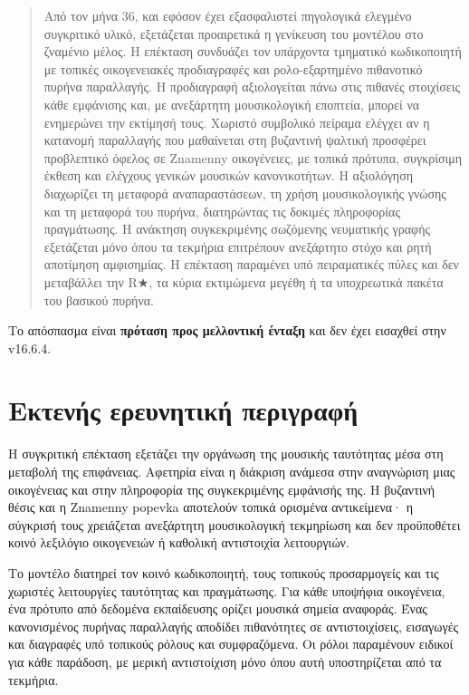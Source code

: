 \documentclass[
  10pt,
  a4paper,
]{report}
\begin{document}
\begin{quote}
Από τον μήνα 36, και εφόσον έχει εξασφαλιστεί πηγολογικά ελεγμένο
συγκριτικό υλικό, εξετάζεται προαιρετικά η γενίκευση του μοντέλου στο
ζναμένιο μέλος. Η επέκταση συνδυάζει τον υπάρχοντα τμηματικό
κωδικοποιητή με τοπικές οικογενειακές προδιαγραφές και ρολο-εξαρτημένο
πιθανοτικό πυρήνα παραλλαγής. Η προδιαγραφή αξιολογείται πάνω στις
πιθανές στοιχίσεις κάθε εμφάνισης και, με ανεξάρτητη μουσικολογική
εποπτεία, μπορεί να ενημερώνει την εκτίμησή τους. Χωριστό συμβολικό
πείραμα ελέγχει αν η κατανομή παραλλαγής που μαθαίνεται στη βυζαντινή
ψαλτική προσφέρει προβλεπτικό όφελος σε Znamenny οικογένειες, με τοπικά
πρότυπα, συγκρίσιμη έκθεση και ελέγχους γενικών μουσικών κανονικοτήτων.
Η αξιολόγηση διαχωρίζει τη μεταφορά αναπαραστάσεων, τη χρήση
μουσικολογικής γνώσης και τη μεταφορά του πυρήνα, διατηρώντας τις
δοκιμές πληροφορίας πραγμάτωσης. Η ανάκτηση συγκεκριμένης σωζόμενης
νευματικής γραφής εξετάζεται μόνο όπου τα τεκμήρια επιτρέπουν ανεξάρτητο
στόχο και ρητή αποτίμηση αμφισημίας. Η επέκταση παραμένει υπό
πειραματικές πύλες και δεν μεταβάλλει την R★, τα κύρια εκτιμώμενα μεγέθη
ή τα υποχρεωτικά πακέτα του βασικού πυρήνα.
\end{quote}

Το απόσπασμα είναι \textbf{πρόταση προς μελλοντική ένταξη} και δεν έχει
εισαχθεί στην v16.6.4.

\section{Εκτενής ερευνητική
περιγραφή}\label{ux3b5ux3baux3c4ux3b5ux3bdux3aeux3c2-ux3b5ux3c1ux3b5ux3c5ux3bdux3b7ux3c4ux3b9ux3baux3ae-ux3c0ux3b5ux3c1ux3b9ux3b3ux3c1ux3b1ux3c6ux3ae}

Η συγκριτική επέκταση εξετάζει την οργάνωση της μουσικής ταυτότητας μέσα
στη μεταβολή της επιφάνειας. Αφετηρία είναι η διάκριση ανάμεσα στην
αναγνώριση μιας οικογένειας και στην πληροφορία της συγκεκριμένης
εμφάνισής της. Η βυζαντινή θέσις και η Znamenny popevka αποτελούν τοπικά
ορισμένα αντικείμενα· η σύγκρισή τους χρειάζεται ανεξάρτητη
μουσικολογική τεκμηρίωση και δεν προϋποθέτει κοινό λεξιλόγιο οικογενειών
ή καθολική αντιστοιχία λειτουργιών.

Το μοντέλο διατηρεί τον κοινό κωδικοποιητή, τους τοπικούς προσαρμογείς
και τις χωριστές λειτουργίες ταυτότητας και πραγμάτωσης. Για κάθε
υποψήφια οικογένεια, ένα πρότυπο από δεδομένα εκπαίδευσης ορίζει μουσικά
σημεία αναφοράς. Ένας κανονισμένος πυρήνας παραλλαγής αποδίδει
πιθανότητες σε αντιστοιχίσεις, εισαγωγές και διαγραφές υπό τοπικούς
ρόλους και συμφραζόμενα. Οι ρόλοι παραμένουν ειδικοί για κάθε παράδοση,
με μερική αντιστοίχιση μόνο όπου αυτή υποστηρίζεται από τα τεκμήρια.
\end{document}
